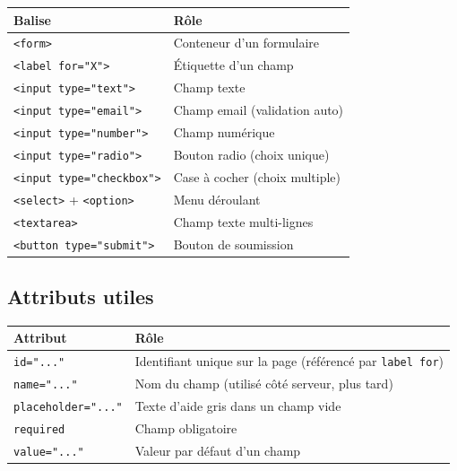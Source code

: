 \documentclass[11pt,a4paper]{article}
\begin{document}
\begin{center}
\begin{tabular}{@{}lp{7.5cm}@{}}
\toprule
\textbf{Balise}                           & \textbf{Rôle} \\
\midrule
\texttt{<form>}                           & Conteneur d'un formulaire \\
\texttt{<label for="X">}                  & Étiquette d'un champ \\
\texttt{<input type="text">}              & Champ texte \\
\texttt{<input type="email">}             & Champ email (validation auto) \\
\texttt{<input type="number">}            & Champ numérique \\
\texttt{<input type="radio">}             & Bouton radio (choix unique) \\
\texttt{<input type="checkbox">}          & Case à cocher (choix multiple) \\
\texttt{<select>} + \texttt{<option>}     & Menu déroulant \\
\texttt{<textarea>}                       & Champ texte multi-lignes \\
\texttt{<button type="submit">}           & Bouton de soumission \\
\bottomrule
\end{tabular}
\end{center}

\subsection{Attributs utiles}

\begin{center}
\begin{tabular}{@{}lp{7.5cm}@{}}
\toprule
\textbf{Attribut}         & \textbf{Rôle} \\
\midrule
\texttt{id="..."}         & Identifiant unique sur la page (référencé par \texttt{label for}) \\
\texttt{name="..."}       & Nom du champ (utilisé côté serveur, plus tard) \\
\texttt{placeholder="..."} & Texte d'aide gris dans un champ vide \\
\texttt{required}         & Champ obligatoire \\
\texttt{value="..."}      & Valeur par défaut d'un champ \\
\bottomrule
\end{tabular}
\end{center}
\end{document}
